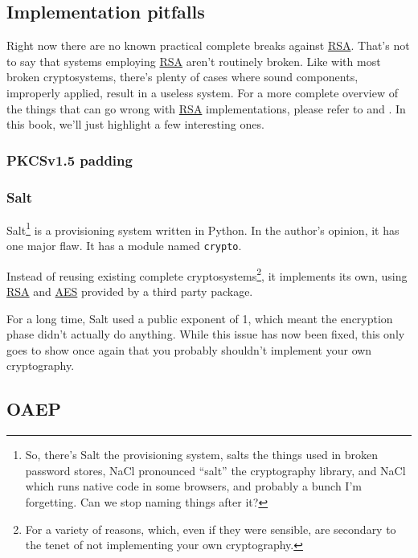 \documentclass[11pt,ebook,table,dvipsnames]{memoir}
\begin{document}
\subsection{Implementation pitfalls}
\label{sec-2-5-3-3}

Right now there are no known practical complete breaks against
\hyperref[RSA]{RSA}. That's not to say that systems employing \hyperref[RSA]{RSA} aren't routinely
broken. Like with most broken cryptosystems, there's plenty of cases
where sound components, improperly applied, result in a useless
system. For a more complete overview of the things that can go wrong
with \hyperref[RSA]{RSA} implementations, please refer to \cite{boneh:twentyyears} and
\cite{anderson:mindingyourpsandqs}. In this book, we'll just highlight
a few interesting ones.

\subsubsection{PKCSv1.5 padding}
\label{sec-2-5-3-3-1}

\subsubsection{Salt}
\label{sec-2-5-3-3-2}

Salt\footnote{So, there's Salt the provisioning system, salts the things
used in broken password stores, NaCl pronounced \enquote{salt} the
cryptography library, and NaCl which runs native code in some
browsers, and probably a bunch I'm forgetting. Can we stop naming
things after it?} is a provisioning system written in Python. In the
author's opinion, it has one major flaw. It has a module named
\texttt{crypto}.

Instead of reusing existing complete cryptosystems\footnote{For a variety
of reasons, which, even if they were sensible, are secondary to the
tenet of not implementing your own cryptography.}, it implements its
own, using \hyperref[RSA]{RSA} and \hyperref[AES]{AES} provided by a third party package.

For a long time, Salt used a public exponent of 1, which meant the
encryption phase didn't actually do anything. While this issue has
now been fixed, this only goes to show once again that you probably
shouldn't implement your own cryptography.


\subsection{\label{OAEP}OAEP}
\label{sec-2-5-3-4}
\end{document}
